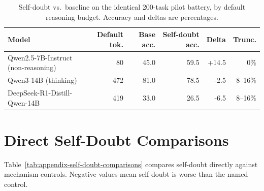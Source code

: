 \documentclass{article}
\begin{document}
\begin{table}[htbp]
\centering
\scriptsize
\caption{Self-doubt vs.\ baseline on the identical 200-task pilot battery, by default reasoning budget. Accuracy and deltas are percentages.}
\label{tab:appendix-ceiling}
\begin{tabular}{lrrrrr}
\toprule
Model & Default tok. & Base acc. & Self-doubt acc. & Delta & Trunc. \\
\midrule
Qwen2.5-7B-Instruct (non-reasoning) & 80 & 45.0 & 59.5 & +14.5 & 0\% \\
Qwen3-14B (thinking) & 472 & 81.0 & 78.5 & -2.5 & 8--16\% \\
DeepSeek-R1-Distill-Qwen-14B & 419 & 33.0 & 26.5 & -6.5 & 8--16\% \\
\bottomrule
\end{tabular}
\end{table}

\section{Direct Self-Doubt Comparisons}

Table~\ref{tab:appendix-self-doubt-comparisons} compares self-doubt directly against mechanism controls. Negative values mean self-doubt is worse than the named control.
\end{document}
